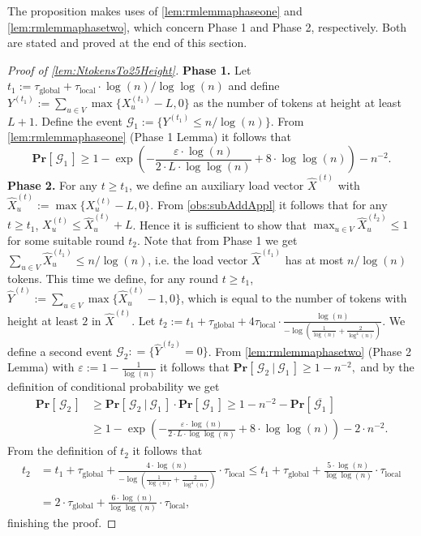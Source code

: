 \documentclass[twoside,leqno]{article}
\newcommand{\Pro}[1]{\mathbf{Pr} \left[\,#1\,\right]}
\DeclareMathOperator{\1}{\mathbf{1}}
\newcommand{\taulocal}{\tau_{\mathrm{local}}}
\newcommand{\tauglobal}{\tau_{\mathrm{global}}}
\numberwithin{equation}{section}
\let\epsilon\varepsilon
\newcommand{\newL}{L}
\begin{document}
The proposition makes uses of \cref{lem:rmlemmaphaseone} and \cref{lem:rmlemmaphasetwo}, which concern Phase 1 and Phase 2, respectively. Both are stated and proved at the end of this section.

\begin{proof}[Proof of \cref{lem:NtokensTo25Height}]
\textbf{Phase 1.} Let $t_1:= \tauglobal + \taulocal\cdot\log(n)/\log \log (n) $ and define $Y^{(t_1)} := \sum_{u \in V} \max\{ X_u^{(t_1)} - \newL , 0 \}$ as the number of tokens at height at least $\newL+1$. Define the event
$
\mathcal{G}_1 := \{Y^{(t_1)} \le {n}/{\log(n)}\}.
$
From \cref{lem:rmlemmaphaseone} (Phase 1 Lemma) it follows that 
\[
\Pro{\mathcal{G}_1} \ge 1-\exp\left(-\frac{\epsilon\cdot \log (n)}{2\cdot \newL\cdot \log\log (n)}
+ 8\cdot\log \log (n)\right)- n^{-2}.
\]
\textbf{Phase 2.} For any $t \geq t_1$, we define an auxiliary load vector $\widehat{X}^{(t)}$ with
$\widehat{X}_u^{(t)}:= \max\{X_u^{(t)}-\newL,0\}$.
From \cref{obs:subAddAppl} it follows that for any $t \geq t_1$,
$X_u^{(t)} \leq \widehat{X}_u^{(t)} + \newL$.
Hence it is sufficient to show that $\max_{u \in V} \widehat{X}_u^{(t_2)} \leq 1$ for some suitable round $t_2$. Note that from  Phase 1 we get  $\sum_{u \in V} \widehat{X}_u^{(t_1)} \leq n/\log(n)$, i.e. the load vector
$\widehat{X}^{(t_1)}$ has at most $n/\log(n)$ tokens.
This time we define, for  any round $t \geq t_1$, 
$\widehat{Y}^{(t)} := \sum_{u\in V} \max\{\widehat{X}_u^{(t)}-1,0\}$,
which is equal to the number of tokens with height at least $2$ in $\widehat{X}^{(t)}$. Let $t_2:=t_1+\tauglobal+4\taulocal\cdot \frac{\log(n)}{-\log(\frac{1}{\log(n)} +\frac{ 2}{\log^4 (n)})}$.
We define a second event
$\mathcal{G}_2 : =\{ \widehat{Y}^{(t_2)} = 0\}$.
From \cref{lem:rmlemmaphasetwo} (Phase 2 Lemma) with $\epsilon:=1-\frac{1}{\log(n)}$ it follows that $\Pro{\mathcal{G}_2 ~|~ \mathcal{G}_1} \ge 1 - n^{-2},$
and by the definition of conditional probability we get
\begin{align*}
\Pro{\mathcal{G}_2} &\ge
\Pro{\mathcal{G}_2 ~|~ \mathcal{G}_1} \cdot \Pro{\mathcal{G}_1} \ge 1- n^{-2} - \Pro{\overline{\mathcal{G}_1}} 
\\& \geq 1 -\exp\left(-\frac{\epsilon\cdot \log (n)}{2\cdot \newL\cdot \log\log (n)}
+ 8\cdot\log \log (n)\right)- 2\cdot n^{-2}.
\end{align*}
From the definition of $t_2$ it follows that
\begin{align*}
    t_2 &= t_1 + \tauglobal +\frac{4\cdot \log (n)}{-\log\left(\frac{1}{\log(n)}+\frac{2}{\log^4 (n)}\right)}\cdot \taulocal \le t_1+ \tauglobal + \frac{5\cdot \log (n)}{\log\log(n)} \cdot \taulocal
    \\& = 2\cdot \tauglobal +  \frac{ 6\cdot\log(n)}{\log\log(n)}\cdot \taulocal,  
\end{align*}
finishing the proof.
\end{proof}
\end{document}

